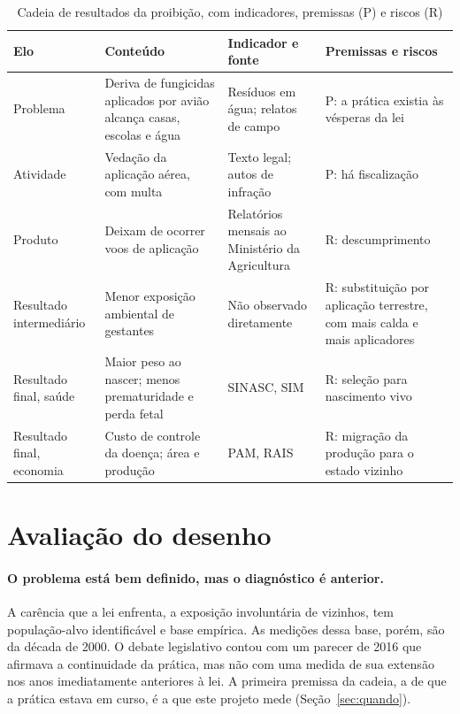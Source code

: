 \begin{table}[ht]
\centering\small
\caption{Cadeia de resultados da proibição, com indicadores, premissas (P) e
riscos (R)}
\label{tab:tdm}
\begin{tabularx}{\textwidth}{@{}p{2.3cm}LLL@{}}
\toprule
Elo & Conteúdo & Indicador e fonte & Premissas e riscos \\
\midrule
Problema & Deriva de fungicidas aplicados por avião alcança casas, escolas e água & Resíduos em água; relatos de campo & P: a prática existia às vésperas da lei \\
Atividade & Vedação da aplicação aérea, com multa & Texto legal; autos de infração & P: há fiscalização \\
Produto & Deixam de ocorrer voos de aplicação & Relatórios mensais ao Ministério da Agricultura & R: descumprimento \\
Resultado intermediário & Menor exposição ambiental de gestantes & Não observado diretamente & R: substituição por aplicação terrestre, com mais calda e mais aplicadores \\
Resultado final, saúde & Maior peso ao nascer; menos prematuridade e perda fetal & SINASC, SIM & R: seleção para nascimento vivo \\
Resultado final, economia & Custo de controle da doença; área e produção & PAM, RAIS & R: migração da produção para o estado vizinho \\
\bottomrule
\end{tabularx}
\end{table}

\section{Avaliação do desenho}

\paragraph{O problema está bem definido, mas o diagnóstico é anterior.} A
carência que a lei enfrenta, a exposição involuntária de vizinhos, tem
população-alvo identificável e base empírica. As medições dessa base, porém,
são da década de 2000. O debate legislativo contou com um parecer de 2016 que
afirmava a continuidade da prática, mas não com uma medida de sua extensão nos
anos imediatamente anteriores à lei. A primeira premissa da cadeia, a de que a
prática estava em curso, é a que este projeto mede (Seção~\ref{sec:quando}).

